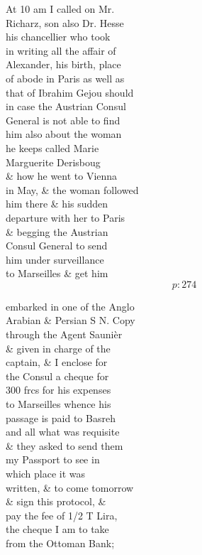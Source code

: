 \documentclass{report}
\begin{document}
	\par{
 	At 10 am I called on Mr.\ \\Richarz, son also Dr. Hesse\ \\his chancellier who took\ \\in writing all the affair of\ \\Alexander, his birth, place\ \\of abode in Paris as well as\ \\that of Ibrahim Gejou should\ \\in case the Austrian Consul\ \\General is not able to find\ \\him also about the woman\ \\he keeps called Marie\ \\Marguerite Derisboug\ \\\& how he went to Vienna\ \\in May, \& the woman followed\ \\him there \& his sudden\ \\departure with her to Paris\ \\\& begging the Austrian\ \\Consul General to send\ \\him under surveillance\ \\to Marseilles \& get him\ \\
  \[p: 274 \]

	}


	\par{
 	embarked in one of the Anglo\ \\Arabian \& Persian S N. Copy\ \\through the Agent Saunièr\ \\\& given in charge of the\ \\captain, \& I enclose for\ \\the Consul a cheque for\ \\300 frcs for his expenses\ \\to Marseilles whence his\ \\passage is paid to Basreh\ \\and all what was requisite\ \\\& they asked to send them\ \\my Passport to see in\ \\which place it was\ \\written, \& to come tomorrow\ \\\& sign this protocol, \&\ \\pay the fee of 1/2 T Lira,\ \\the cheque I am to take\ \\from the Ottoman Bank;\ \\
	}
\end{document}
